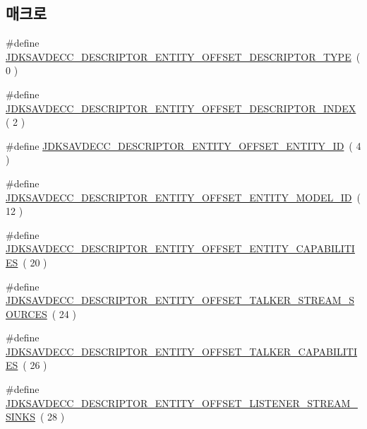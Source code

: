 \subsection*{매크로}
\begin{DoxyCompactItemize}
\item 
\#define \hyperlink{group__descriptor__entity_ga834412c490d248e344135ca60eac5868}{J\+D\+K\+S\+A\+V\+D\+E\+C\+C\+\_\+\+D\+E\+S\+C\+R\+I\+P\+T\+O\+R\+\_\+\+E\+N\+T\+I\+T\+Y\+\_\+\+O\+F\+F\+S\+E\+T\+\_\+\+D\+E\+S\+C\+R\+I\+P\+T\+O\+R\+\_\+\+T\+Y\+PE}~( 0 )
\item 
\#define \hyperlink{group__descriptor__entity_ga837cc2f5923e215364bf2b5a722af046}{J\+D\+K\+S\+A\+V\+D\+E\+C\+C\+\_\+\+D\+E\+S\+C\+R\+I\+P\+T\+O\+R\+\_\+\+E\+N\+T\+I\+T\+Y\+\_\+\+O\+F\+F\+S\+E\+T\+\_\+\+D\+E\+S\+C\+R\+I\+P\+T\+O\+R\+\_\+\+I\+N\+D\+EX}~( 2 )
\item 
\#define \hyperlink{group__descriptor__entity_ga9260738bb6b9a15385a41eb7b625e62c}{J\+D\+K\+S\+A\+V\+D\+E\+C\+C\+\_\+\+D\+E\+S\+C\+R\+I\+P\+T\+O\+R\+\_\+\+E\+N\+T\+I\+T\+Y\+\_\+\+O\+F\+F\+S\+E\+T\+\_\+\+E\+N\+T\+I\+T\+Y\+\_\+\+ID}~( 4 )
\item 
\#define \hyperlink{group__descriptor__entity_ga1801944034d2a89b6fb4dee8a52763a7}{J\+D\+K\+S\+A\+V\+D\+E\+C\+C\+\_\+\+D\+E\+S\+C\+R\+I\+P\+T\+O\+R\+\_\+\+E\+N\+T\+I\+T\+Y\+\_\+\+O\+F\+F\+S\+E\+T\+\_\+\+E\+N\+T\+I\+T\+Y\+\_\+\+M\+O\+D\+E\+L\+\_\+\+ID}~( 12 )
\item 
\#define \hyperlink{group__descriptor__entity_ga0ee401dfc4c9876b944c3328a7b481e5}{J\+D\+K\+S\+A\+V\+D\+E\+C\+C\+\_\+\+D\+E\+S\+C\+R\+I\+P\+T\+O\+R\+\_\+\+E\+N\+T\+I\+T\+Y\+\_\+\+O\+F\+F\+S\+E\+T\+\_\+\+E\+N\+T\+I\+T\+Y\+\_\+\+C\+A\+P\+A\+B\+I\+L\+I\+T\+I\+ES}~( 20 )
\item 
\#define \hyperlink{group__descriptor__entity_ga5392123a5ab85eab86651c4380fcb34f}{J\+D\+K\+S\+A\+V\+D\+E\+C\+C\+\_\+\+D\+E\+S\+C\+R\+I\+P\+T\+O\+R\+\_\+\+E\+N\+T\+I\+T\+Y\+\_\+\+O\+F\+F\+S\+E\+T\+\_\+\+T\+A\+L\+K\+E\+R\+\_\+\+S\+T\+R\+E\+A\+M\+\_\+\+S\+O\+U\+R\+C\+ES}~( 24 )
\item 
\#define \hyperlink{group__descriptor__entity_gad4b11f04a5ef215fd2ae4b236ad23824}{J\+D\+K\+S\+A\+V\+D\+E\+C\+C\+\_\+\+D\+E\+S\+C\+R\+I\+P\+T\+O\+R\+\_\+\+E\+N\+T\+I\+T\+Y\+\_\+\+O\+F\+F\+S\+E\+T\+\_\+\+T\+A\+L\+K\+E\+R\+\_\+\+C\+A\+P\+A\+B\+I\+L\+I\+T\+I\+ES}~( 26 )
\item 
\#define \hyperlink{group__descriptor__entity_ga1e463128931ccd4945bad71680beb1f8}{J\+D\+K\+S\+A\+V\+D\+E\+C\+C\+\_\+\+D\+E\+S\+C\+R\+I\+P\+T\+O\+R\+\_\+\+E\+N\+T\+I\+T\+Y\+\_\+\+O\+F\+F\+S\+E\+T\+\_\+\+L\+I\+S\+T\+E\+N\+E\+R\+\_\+\+S\+T\+R\+E\+A\+M\+\_\+\+S\+I\+N\+KS}~( 28 )

\end{DoxyCompactItemize}
